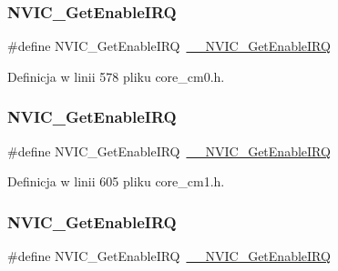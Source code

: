 \subsubsection{\texorpdfstring{N\+V\+I\+C\+\_\+\+Get\+Enable\+I\+RQ}{NVIC\_GetEnableIRQ}\hspace{0.1cm}{\footnotesize\ttfamily [1/12]}}
{\footnotesize\ttfamily \#define N\+V\+I\+C\+\_\+\+Get\+Enable\+I\+RQ~\hyperlink{group___c_m_s_i_s___core___n_v_i_c_functions_gaaeb5e7cc0eaad4e2817272e7bf742083}{\+\_\+\+\_\+\+N\+V\+I\+C\+\_\+\+Get\+Enable\+I\+RQ}}



Definicja w linii 578 pliku core\+\_\+cm0.\+h.

\mbox{\label{group___c_m_s_i_s___core___n_v_i_c_functions_ga857de13232ec65dd15087eaa15bc4a69}} 
\subsubsection{\texorpdfstring{N\+V\+I\+C\+\_\+\+Get\+Enable\+I\+RQ}{NVIC\_GetEnableIRQ}\hspace{0.1cm}{\footnotesize\ttfamily [2/12]}}
{\footnotesize\ttfamily \#define N\+V\+I\+C\+\_\+\+Get\+Enable\+I\+RQ~\hyperlink{group___c_m_s_i_s___core___n_v_i_c_functions_gaaeb5e7cc0eaad4e2817272e7bf742083}{\+\_\+\+\_\+\+N\+V\+I\+C\+\_\+\+Get\+Enable\+I\+RQ}}



Definicja w linii 605 pliku core\+\_\+cm1.\+h.

\mbox{\label{group___c_m_s_i_s___core___n_v_i_c_functions_ga857de13232ec65dd15087eaa15bc4a69}} 
\subsubsection{\texorpdfstring{N\+V\+I\+C\+\_\+\+Get\+Enable\+I\+RQ}{NVIC\_GetEnableIRQ}\hspace{0.1cm}{\footnotesize\ttfamily [3/12]}}
{\footnotesize\ttfamily \#define N\+V\+I\+C\+\_\+\+Get\+Enable\+I\+RQ~\hyperlink{group___c_m_s_i_s___core___n_v_i_c_functions_gaaeb5e7cc0eaad4e2817272e7bf742083}{\+\_\+\+\_\+\+N\+V\+I\+C\+\_\+\+Get\+Enable\+I\+RQ}}



